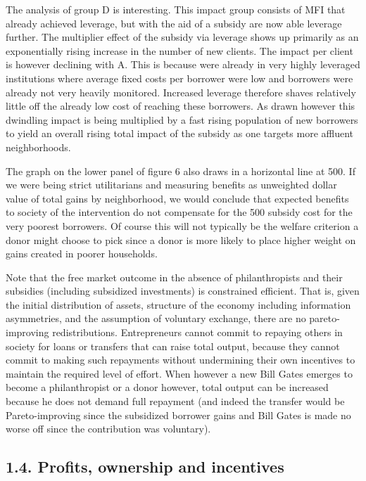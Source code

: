 \documentclass[
]{article}
\begin{document}
The analysis of group D is interesting. This impact group consists of
MFI that already achieved leverage, but with the aid of a subsidy are
now able leverage further. The multiplier effect of the subsidy via
leverage shows up primarily as an exponentially rising increase in the
number of new clients. The impact per client is however declining with
\(\text{A.}\) This is because were already in very highly leveraged
institutions where average fixed costs per borrower were low and
borrowers were already not very heavily monitored. Increased leverage
therefore shaves relatively little off the already low cost of reaching
these borrowers. As drawn however this dwindling impact is being
multiplied by a fast rising population of new borrowers to yield an
overall rising total impact of the subsidy as one targets more affluent
neighborhoods.

The graph on the lower panel of figure 6 also draws in a horizontal line
at 500. If we were being strict utilitarians and measuring benefits as
unweighted dollar value of total gains by neighborhood, we would
conclude that expected benefits to society of the intervention do not
compensate for the 500 subsidy cost for the very poorest borrowers. Of
course this will not typically be the welfare criterion a donor might
choose to pick since a donor is more likely to place higher weight on
gains created in poorer households.

Note that the free market outcome in the absence of philanthropists and
their subsidies (including subsidized investments) is constrained
efficient. That is, given the initial distribution of assets, structure
of the economy including information asymmetries, and the assumption of
voluntary exchange, there are no pareto-improving redistributions.
Entrepreneurs cannot commit to repaying others in society for loans or
transfers that can raise total output, because they cannot commit to
making such repayments without undermining their own incentives to
maintain the required level of effort. When however a new Bill Gates
emerges to become a philanthropist or a donor however, total output can
be increased because he does not demand full repayment (and indeed the
transfer would be Pareto-improving since the subsidized borrower gains
and Bill Gates is made no worse off since the contribution was
voluntary).

\hypertarget{profits-ownership-and-incentives}{%
\subsection{1.4. Profits, ownership and incentives
}\label{profits-ownership-and-incentives}}
\end{document}
